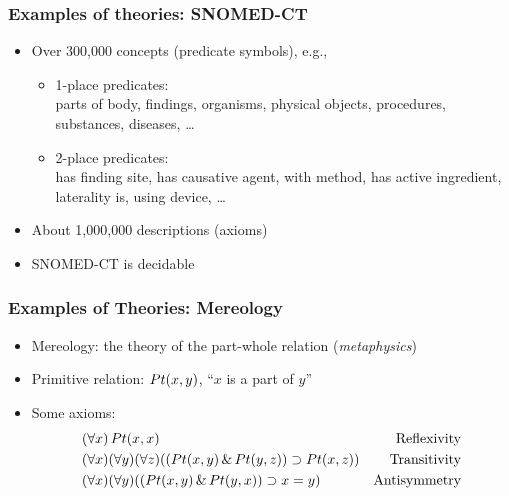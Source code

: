\begin{frame}
    \frametitle{Examples of theories: SNOMED-CT}

\begin{itemize}[<+->]
\item Over 300,000 concepts (predicate symbols), e.g.,\\
\begin{itemize}[<+->]
\item 1-place predicates:\\
parts of body, findings, organisms, physical objects, procedures, substances, diseases, \dots
\item 2-place predicates:\\
has finding site, has causative agent, with method, has active ingredient, laterality is, using device, \dots
\end{itemize}
\item About 1,000,000 descriptions (axioms)
\item SNOMED-CT is decidable
\end{itemize}

\end{frame}

\begin{frame}
    \frametitle{Examples of Theories: Mereology}

\begin{itemize}[<+->]
\item Mereology: the theory of the part-whole relation (\emph{metaphysics})
\item Primitive relation: $Pt(x, y)$, ``$x$ is a part of $y$''
\item Some axioms:
\begin{align*}
& (\forall x)\, Pt(x, x) & \text{Reflexivity}\\
& (\forall x)(\forall y)(\forall z)((Pt(x, y) \,\&\, Pt(y, z)) \supset Pt(x, z)) & \text{Transitivity}\\
& (\forall x)(\forall y)((Pt(x, y) \,\&\, Pt(y, x)) \supset x = y) & \text{Antisymmetry}
\end{align*}
\end{itemize}
\end{frame}

